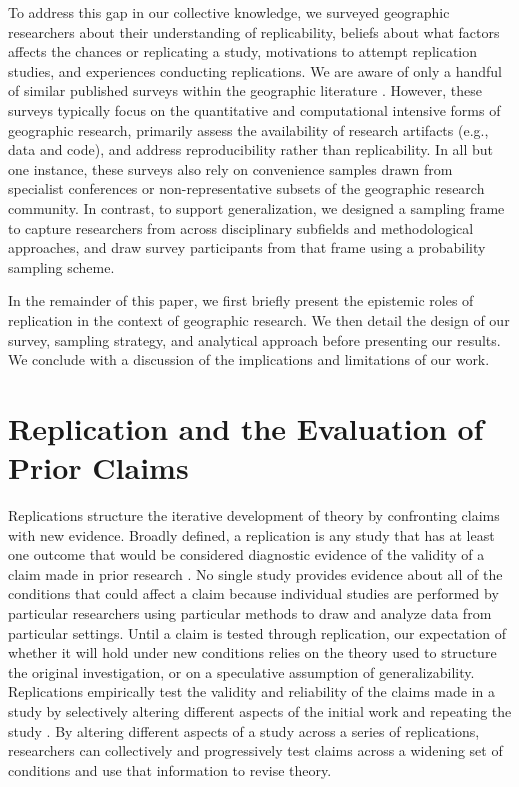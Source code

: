 \documentclass[]{interact}
\theoremstyle{plain}%
\theoremstyle{definition}
\theoremstyle{remark}
\begin{document}
To address this gap in our collective knowledge, we surveyed geographic researchers about their understanding of replicability, beliefs about what factors affects the chances or replicating a study, motivations to attempt replication studies, and experiences conducting replications.
We are aware of only a handful of similar published surveys within the geographic literature \citep{balz2020reproducibility, konkol2019, ostermann2017, kedron2023survey}.
However, these surveys typically focus on the quantitative and computational intensive forms of geographic research, primarily assess the availability of research artifacts (e.g., data and code), and address reproducibility rather than replicability. 
In all but one instance, these surveys also rely on convenience samples drawn from specialist conferences or non-representative subsets of the geographic research community. 
In contrast, to support generalization, we designed a sampling frame to capture researchers from across disciplinary subfields and methodological approaches, and draw survey participants from that frame using a probability sampling scheme.

In the remainder of this paper, we first briefly present the epistemic roles of replication in the context of geographic research.
We then detail the design of our survey, sampling strategy, and analytical approach before presenting our results. 
We conclude with a discussion of the implications and limitations of our work. 


\section*{Replication and the Evaluation of Prior Claims}
Replications structure the iterative development of theory by confronting claims with new evidence.
Broadly defined, a replication is any study that has at least one outcome that would be considered diagnostic evidence of the validity of a claim made in prior research \citep{nosek2020}.
No single study provides evidence about all of the conditions that could affect a claim because individual studies are performed by particular researchers using particular methods to draw and analyze data from particular settings. 
Until a claim is tested through replication, our expectation of whether it will hold under new conditions relies on the theory used to structure the original investigation, or on a speculative assumption of generalizability.
Replications empirically test the validity and reliability of the claims made in a study by selectively altering different aspects of the initial work and repeating the study \citep{schmidt2009, gomez2010replications, radder2003, radder2012}.  
By altering different aspects of a study across a series of replications, researchers can collectively and progressively test claims across a widening set of conditions and use that information to revise theory.
\end{document}

